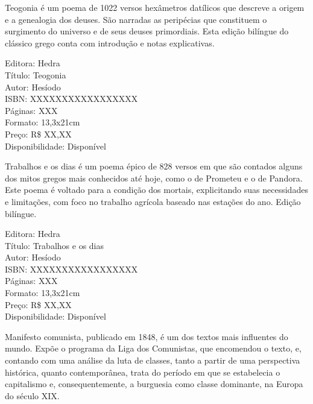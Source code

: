 \pagebreak


\noindent{}Teogonia é um poema de 1022 versos hexâmetros datílicos que descreve a origem e a genealogia dos deuses. São narradas as peripécias que constituem o surgimento do universo e de seus deuses primordiais. Esta edição bilíngue do clássico grego conta com introdução e notas explicativas.

\begin{ficha}
Editora: Hedra\\
Título: Teogonia\\
Autor: Hesíodo\\ 
ISBN: XXXXXXXXXXXXXXXXX\\
Páginas: XXX\\
Formato: 13,3x21cm\\
Preço: R\$ XX,XX\\
Disponibilidade: Disponível
\end{ficha}

\pagebreak


\noindent{}Trabalhos e os dias é um poema épico de 828 versos em que são contados alguns dos mitos gregos mais conhecidos até hoje, como o de Prometeu e o de Pandora. Este poema é voltado para a condição dos mortais, explicitando suas necessidades e limitações, com foco no trabalho agrícola baseado nas estações do ano. Edição bilíngue.

\begin{ficha}
Editora: Hedra\\
Título: Trabalhos e os dias\\
Autor: Hesíodo\\ 
ISBN: XXXXXXXXXXXXXXXXX\\
Páginas: XXX\\
Formato: 13,3x21cm\\
Preço: R\$ XX,XX\\
Disponibilidade: Disponível
\end{ficha}

\pagebreak


\noindent{}Manifesto comunista, publicado em 1848, é um dos textos mais influentes do mundo. Expõe o programa da Liga dos Comunistas, que encomendou o texto, e, contando com uma análise da luta de classes, tanto a partir de uma perspectiva histórica, quanto contemporânea, trata do período em que se estabelecia o capitalismo e, consequentemente, a burguesia como classe dominante, na Europa do século XIX.

